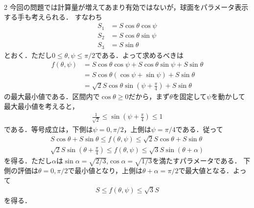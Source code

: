 \documentclass[../../main.tex]{subfiles}
\begin{document}
\begin{multicols}{2}
  今回の問題では計算量が増えてあまり有効ではないが，球面をパラメータ表示する手も考えられる．
  すなわち
  \begin{align*}
    S_1 & = S\cos\theta\cos\psi \\
    S_2 & = S\cos\theta\sin\psi \\
    S_3 & = S\sin\theta
  \end{align*}
  とおく．ただし$0\le\theta,\psi\le\pi/2$である．よって求めるべきは
  \begin{align*}
    f(\theta,\psi)
     & = S\cos\theta\cos\psi+S\cos\theta\sin\psi+S\sin\theta                  \\
     & = S\cos\theta\left(\cos\psi+\sin\psi\right)+S\sin\theta                \\
     & = \sqrt{2}S\cos\theta\sin\left(\psi+\frac{\pi}{4}\right) + S\sin\theta
  \end{align*}
  の最大最小値である．区間内で$\cos\theta\ge 0$だから，まず$\theta$を固定して$\psi$を動かして
  最大最小値を考えると，
  \begin{align*}
    \frac{1}{\sqrt{2}} \le \sin\left(\psi+\frac{\pi}{4}\right) \le 1
  \end{align*}
  である．等号成立は，下側は$\psi=0,\pi/2$，上側は$\psi=\pi/4$である．従って
  \begin{align*}
    S\cos\theta + S\sin\theta \le f(\theta,\psi) \le \sqrt{2}S\cos\theta + S\sin\theta \\
    \sqrt{2}S\sin\left(\theta+\frac{\pi}{4}\right) \le f(\theta,\psi) \le \sqrt{3}S\sin(\theta+\alpha)
  \end{align*}
  を得る．ただし$\alpha$は$\sin\alpha=\sqrt{2/3}$,$\cos\alpha=\sqrt{1/3}$を満たすパラメータである．
  下側の評価は$\theta=0,\pi/2$で最小値となり，上側は$\theta+\alpha=\pi/2$で最大値となる．よって
  \begin{align*}
    S \le f(\theta,\psi) \le \sqrt{3} S
  \end{align*}
  を得る．



  \newpage
\end{multicols}
\end{document}

